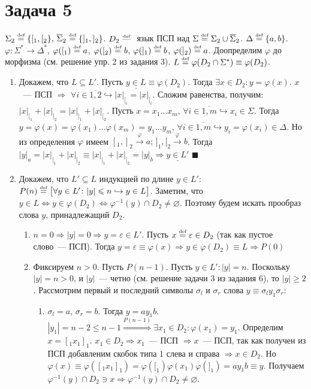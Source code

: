 \documentclass[a4paper]{article}
\def\eqdef{\overset{\mbox{\tiny def}}{=}}
\begin{document}
\section*{Задача 5}
$\Sigma_2\eqdef\{[_1,[_2\},\,\overline{\Sigma}_2\eqdef\{]_1,]_2\}$. $D_2\overset{\mbox{\tiny def}}{\mbox{ --- }}$ язык ПСП над $\Sigma\eqdef \Sigma_2\cup\overline{\Sigma}_2$. $\Delta\eqdef\{a,b\}$. $\varphi\colon \Sigma^*\longrightarrow \Delta^*$, $\varphi([_1)\eqdef a$, $\varphi([_2)\eqdef b$, $\varphi(]_1)\eqdef b$, $\varphi(]_2)\eqdef a$. Доопределим $\varphi$ до морфизма (см. решение упр. 2 из задания 3). $L\eqdef \varphi(D_2\cap \Sigma^*)\equiv \varphi(D_2)$.
\begin{enumerate}
\item Докажем, что $L\subseteq L'$. Пусть $\underline{y\in L}\equiv \varphi(D_2)$. Тогда $\exists x\in D_2\colon y=\varphi(x)$. $x$~--- ПСП $\Rightarrow$ $\forall i\in\overline{1,2}\hookrightarrow |x|_{[_i}=|x|_{]_i}$. Сложим равенства, получим: $|x|_{[_1}+|x|_{]_2}=|x|_{]_1}+|x|_{[_2}$. Пусть $x=x_1...x_m,\,\forall i\in\overline{1,m}\hookrightarrow x_i\in\Sigma$. Тогда $y=\varphi(x)=\varphi(x_1)...\varphi(x_m)=y_1...y_m,\,\forall i\in\overline{1,m}\hookrightarrow y_i=\varphi(x_i)\in\Delta$. Но из определения $\varphi$ имеем $[_1,]_2\overset{\varphi}{\rightarrow}a;\,]_1,[_2\overset{\varphi}{\rightarrow}b$. Тогда $|y|_a=|x|_{[_1}+|x|_{]_2}\equiv|x|_{]_1}+|x|_{[_2}=|y|_b\Rightarrow \underline{y\in L'}$ $\blacksquare$
\item Докажем, что $L'\subseteq L$ индукцией по длине $y\in L'$: $P(n)\eqdef\big[\forall y\in L'\colon |y|\leqslant n\hookrightarrow y\in L\big]$.\newline
Заметим, что $y\in L\Leftrightarrow y\in \varphi(D_2)\Leftrightarrow \varphi^{-1}(y)\cap D_2\neq\varnothing$. Поэтому будем искать прообраз слова $y$, принадлежащий $D_2$.\begin{enumerate}
\item $n=0\Rightarrow |y|=0\Rightarrow y=\varepsilon\in L'$. Пусть $x\eqdef\varepsilon\in D_2$ (так как пустое слово~--- ПСП). Тогда $y=\varepsilon\equiv\varphi(x)\Rightarrow y\in \varphi(D_2)\equiv L\Rightarrow P(0)$
\item Фиксируем $n>0$. Пусть $P(n-1)$. Пусть $y\in L'\colon |y|=n$. Поскольку $|y|=n>0$, и $|y|$~--- четно (см. решение задачи 3 из задания 6), то $|y|\geqslant 2$. Рассмотрим первый и последний символы $\sigma_l$ и $\sigma_r$ слова $y\equiv \sigma_ly_1\sigma_r$:\begin{enumerate}
\item $\sigma_l=a,\,\sigma_r=b$. Тогда $y=ay_1b$. $|y_1|=n-2\leqslant n-1\overset{P(n-1)}{\Rightarrow}\exists x_1\in D_2\colon \varphi(x_1)=y_1$. Определим $x=[_1x_1]_1$. $x_1\in D_2\Rightarrow x_1$~--- ПСП $\Rightarrow x$~--- ПСП, так как получен из ПСП добавленим скобок типа $1$ слева и справа $\Rightarrow x\in D_2$. Но $\varphi(x)\equiv\varphi([_1x_1]_1)=\varphi([_1)\varphi(x_1)\varphi(]_1)=ay_1b\equiv y$. Получаем $\varphi^{-1}(y)\cap D_2\ni x\Rightarrow \varphi^{-1}(y)\cap D_2\neq\varnothing$.

\end{enumerate}
\end{enumerate}
\end{enumerate}
\end{document}
